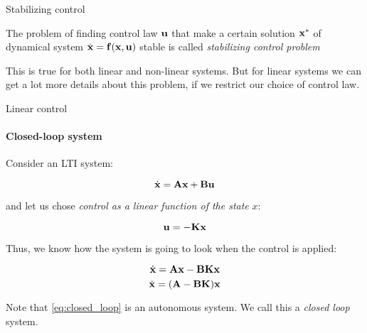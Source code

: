 \documentclass{beamer}
\begin{document}
\begin{frame}{Stabilizing control}
\begin{flushleft}

\begin{definition}
The problem of finding control law $\mathbf{u}$ that make a certain solution $\mathbf{x}^*$ of dynamical system $\dot{\mathbf{x}} = \mathbf{f}(\mathbf{x}, \mathbf{u})$ stable is called \emph{stabilizing control problem}
\end{definition}

\bigskip

This is true for both linear and non-linear systems. But for linear systems we can get a lot more details about this problem, if we restrict our choice of control law.



\end{flushleft}
\end{frame}



\begin{frame}{Linear control}
\framesubtitle{Closed-loop system}
\begin{flushleft}

Consider an LTI system:

\begin{equation}
    \dot{\mathbf{x}} = \mathbf{A}\mathbf{x} + \mathbf{B}\mathbf{u}
\end{equation}

and let us chose \emph{control as a linear function of the state} $x$:

\begin{equation}
    \mathbf{u} = -\mathbf{K}\mathbf{x}
\end{equation}

Thus, we know how the system is going to look when the control is applied:

\begin{equation}
    \dot{\mathbf{x}} = \mathbf{A}\mathbf{x} - \mathbf{B}\mathbf{K}\mathbf{x}
\end{equation}
\begin{equation}
\label{eq:closed_loop}
    \dot{\mathbf{x}} = (\mathbf{A} - \mathbf{B}\mathbf{K})\mathbf{x}
\end{equation}

Note that \eqref{eq:closed_loop} is an autonomous system. We call this a \emph{closed loop} system.

\end{flushleft}
\end{frame}
\end{document}
